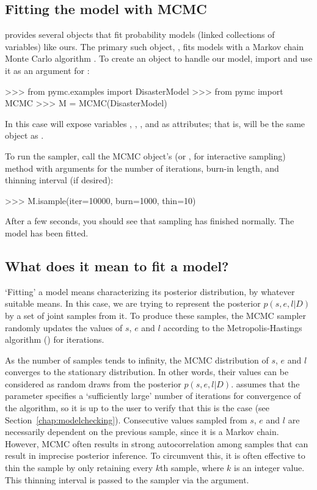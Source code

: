 \documentclass[]{jss}
\begin{document}
\subsection{Fitting the model with MCMC}

 provides several objects that fit probability models (linked collections of variables) like ours. The primary such object, , fits models with a Markov chain Monte Carlo algorithm \citep{Gamerman:1997tb}. To create an  object to handle our model, import  and use it as an argument for :
\begin{CodeInput}
>>> from pymc.examples import DisasterModel
>>> from pymc import MCMC
>>> M = MCMC(DisasterModel)
\end{CodeInput}
In this case  will expose variables , , ,  and  as attributes; that is,  will be the same object as .

To run the sampler, call the MCMC object's  (or , for  interactive sampling) method with arguments for the number of iterations, burn-in length, and thinning interval (if desired):
\begin{CodeInput}
>>> M.isample(iter=10000, burn=1000, thin=10)
\end{CodeInput}
After a few seconds, you should see that sampling has finished normally. The model has been fitted.

\subsection{What does it mean to fit a model?}

`Fitting' a model means characterizing its posterior distribution, by whatever suitable means. In this case, we are trying to represent the posterior $p(s,e,l|D)$ by a set of joint samples from it. To produce these samples, the MCMC sampler randomly updates the values of $s$, $e$ and $l$ according to the Metropolis-Hastings algorithm (\citet{gelman}) for   iterations.

As the number of samples tends to infinity, the MCMC distribution of $s$, $e$
and $l$ converges to the stationary distribution. In other words, their
values can be considered as random draws from the posterior $p(s,e,l|D)$.
 assumes that the  parameter specifies a `sufficiently large'
number of iterations for convergence of the algorithm, so it is up to the user
to verify
that this is the case (see Section~\ref{chap:modelchecking}). Consecutive values
sampled from $s$, $e$ and $l$ are necessarily dependent on the previous sample,
since it is a Markov chain. However, MCMC often results in strong
autocorrelation among samples that can result in imprecise posterior inference.
To circumvent this, it is often effective to thin the sample by only retaining
every $k$th sample, where $k$ is an integer value. This thinning interval is
passed to the sampler via the  argument.
\end{document}
